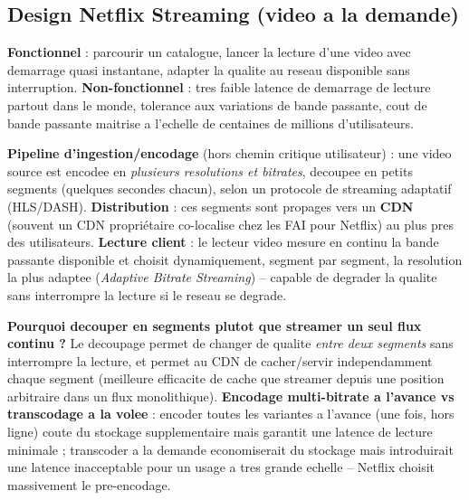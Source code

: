 \documentclass[11pt,a4paper]{article}
\newenvironment{sujet}[1]{%
  \subsection{#1}
}{%
  \bigskip
}
\begin{document}
\begin{sujet}{Design Netflix Streaming (video a la demande)}

\begin{req}
\textbf{Fonctionnel} : parcourir un catalogue, lancer la lecture d'une video avec demarrage quasi instantane, adapter la qualite au reseau disponible sans interruption. \textbf{Non-fonctionnel} : tres faible latence de demarrage de lecture partout dans le monde, tolerance aux variations de bande passante, cout de bande passante maitrise a l'echelle de centaines de millions d'utilisateurs.
\end{req}

\begin{archbox}
\textbf{Pipeline d'ingestion/encodage} (hors chemin critique utilisateur) : une video source est encodee en \emph{plusieurs resolutions et bitrates}, decoupee en petits segments (quelques secondes chacun), selon un protocole de streaming adaptatif (HLS/DASH). \textbf{Distribution} : ces segments sont propages vers un \textbf{CDN} (souvent un CDN propriétaire co-localise chez les FAI pour Netflix) au plus pres des utilisateurs. \textbf{Lecture client} : le lecteur video mesure en continu la bande passante disponible et choisit dynamiquement, segment par segment, la resolution la plus adaptee (\emph{Adaptive Bitrate Streaming}) -- capable de degrader la qualite sans interrompre la lecture si le reseau se degrade.
\end{archbox}

\begin{tradeoff}
\textbf{Pourquoi decouper en segments plutot que streamer un seul flux continu ?} Le decoupage permet de changer de qualite \emph{entre deux segments} sans interrompre la lecture, et permet au CDN de cacher/servir independamment chaque segment (meilleure efficacite de cache que streamer depuis une position arbitraire dans un flux monolithique). \textbf{Encodage multi-bitrate a l'avance vs transcodage a la volee} : encoder toutes les variantes a l'avance (une fois, hors ligne) coute du stockage supplementaire mais garantit une latence de lecture minimale ; transcoder a la demande economiserait du stockage mais introduirait une latence inacceptable pour un usage a tres grande echelle -- Netflix choisit massivement le pre-encodage.
\end{tradeoff}

\end{sujet}
\end{document}
